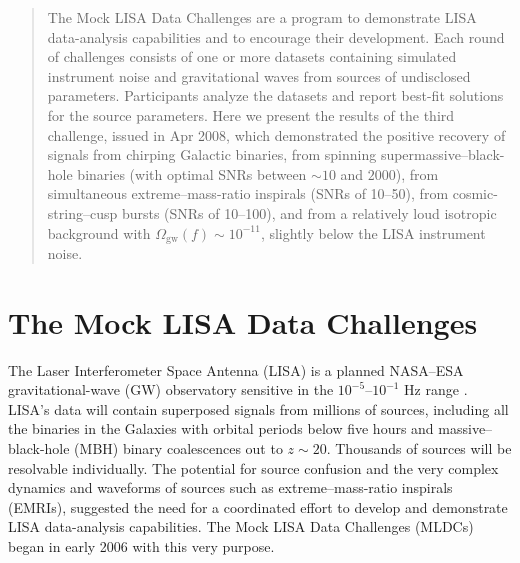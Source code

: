 \documentclass{iopart}
\begin{document}

\begin{abstract}
The Mock LISA Data Challenges are a program to demonstrate LISA data-analysis capabilities and to encourage their development. Each round of challenges consists of one or more datasets containing simulated instrument noise and gravitational waves from sources of undisclosed parameters. Participants analyze the datasets and report best-fit solutions for the source parameters. Here we present the results of the third challenge, issued in Apr 2008, which demonstrated the positive recovery of signals from chirping Galactic binaries, from spinning supermassive--black-hole binaries (with optimal SNRs between $\sim 10$ and $2000$), from simultaneous extreme--mass-ratio inspirals (SNRs of 10--50), from cosmic-string--cusp bursts (SNRs of 10--100), and from a relatively loud isotropic background with $\Omega_\mathrm{gw}(f) \sim 10^{-11}$, slightly below the LISA instrument noise.
\end{abstract}

\vspace{-18pt}


\section{The Mock LISA Data Challenges}

The Laser Interferometer Space Antenna (LISA) is a planned NASA--ESA gravitational-wave (GW) observatory sensitive in the $10^{-5}$--$10^{-1}$ Hz range \cite{lisa}. LISA's data will contain superposed signals from millions of sources, including all the binaries in the Galaxies with orbital periods below five hours and massive--black-hole (MBH) binary coalescences out to $z \sim 20$. Thousands of sources will be resolvable individually. The potential for source confusion and the very complex dynamics and waveforms of sources such as extreme--mass-ratio inspirals (EMRIs), suggested the need for a coordinated effort to develop and demonstrate LISA data-analysis capabilities. The Mock LISA Data Challenges (MLDCs) began in early 2006 with this very purpose.
\end{document}
